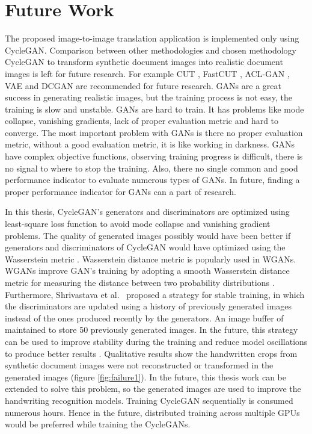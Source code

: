 \section{Future Work}\label{FutureWork}

The proposed image-to-image translation application is implemented only using \ac{CycleGAN}. Comparison between other methodologies and chosen methodology \ac{CycleGAN} to transform synthetic document images into realistic document images is left for future research. For example \ac{CUT} \cite{park2020contrastive}, \ac{FastCUT} \cite{park2020contrastive}, \ac{ACL-GAN} \cite{zhao2021unpaired}, \ac{VAE} \cite{Kingma_2019} and \ac{DCGAN} \cite{radford2016unsupervised} are recommended for future research. \acp{GAN} are a great success in generating realistic images, but the training process is not easy, the training is slow and unstable. \acp{GAN} are hard to train. It has problems like mode collapse, vanishing gradients, lack of proper evaluation metric and hard to converge. The most important problem with \acp{GAN} is there no proper evaluation metric, without a good evaluation metric, it is like working in darkness. \acp{GAN} have complex objective functions, observing training progress is difficult, there is no signal to where to stop the training. Also, there no single common and good performance indicator to evaluate numerous types of \acp{GAN}. In future, finding a proper performance indicator for \acp{GAN} can a part of research. 

In this thesis, \ac{CycleGAN}'s generators and discriminators are optimized using least-square loss function \cite{mao2017squares} to avoid mode collapse and vanishing gradient problems. The quality of generated images possibly would have been better if generators and discriminators of \ac{CycleGAN} would have optimized using the Wasserstein metric \cite{arjovsky2017wasserstein}. Wasserstein distance metric is popularly used in \acp{WGAN}. \acp{WGAN} improve \ac{GAN}'s training by adopting a smooth Wasserstein distance metric for measuring the distance between two probability distributions \cite{arjovsky2017wasserstein}. Furthermore, Shrivastava et al.\ \cite{shrivastava2017learning} proposed a strategy for stable training, in which the discriminators are updated using a history of previously generated images instead of the ones produced recently by the generators. An image buffer of maintained to store 50 previously generated images. In the future, this strategy can be used to improve stability during the training and reduce model oscillations to produce better results \cite{shrivastava2017learning}. Qualitative results show the handwritten crops from synthetic document images were not reconstructed or transformed in the generated images (figure \ref{fig:failure1}). In the future, this thesis work can be extended to solve this problem, so the generated images are used to improve the handwriting recognition models. Training \ac{CycleGAN} sequentially is consumed numerous hours. Hence in the future, distributed training across multiple GPUs would be preferred while training the \acp{CycleGAN}.

